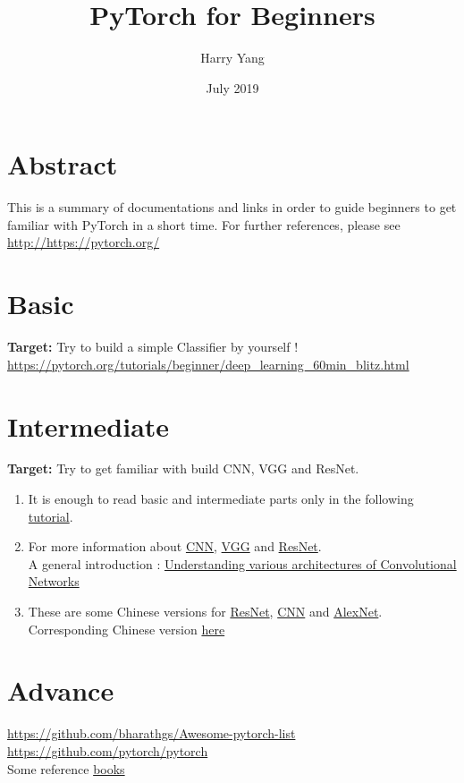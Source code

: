 \documentclass{article}
\title{PyTorch for Beginners}
\author{Harry Yang}
\date{July 2019}
\begin{document}
\maketitle

\section{Abstract}
This is a summary of documentations and links in order to guide beginners to get familiar with PyTorch in a short time. For further references, please see  \url{http://https://pytorch.org/} 
\section{Basic}
\textbf{Target: } Try to build a simple Classifier by yourself ! \\
\url{https://pytorch.org/tutorials/beginner/deep_learning_60min_blitz.html}
\section{Intermediate}
\textbf{Target: } Try to get familiar with build CNN, VGG and ResNet. \\
\begin{enumerate}
    \item It is enough to read basic and intermediate parts only in the following \href{https://github.com/yunjey/pytorch-tutorial/tree/master/tutorials}{tutorial}.
    \item For more information about \href{https://github.com/yunjey/pytorch-tutorial/tree/master/tutorials}{CNN}, \href{https://github.com/yunjey/pytorch-tutorial/tree/master/tutorials}{VGG} and \href{https://towardsdatascience.com/an-overview-of-resnet-and-its-variants-5281e2f56035}{ResNet}.\\
    A general introduction : \href{https://cv-tricks.com/cnn/understand-resnet-alexnet-vgg-inception/}{Understanding various architectures of Convolutional Networks}
    \item These are some Chinese versions for \href{https://zhuanlan.zhihu.com/p/31852747}{ResNet}, \href{https://blog.csdn.net/v_JULY_v/article/details/51812459}{CNN} and \href{https://blog.csdn.net/daydayup_668819/article/details/79744095}{AlexNet}.\\
    Corresponding Chinese version \href{https://zhuanlan.zhihu.com/p/32116277}{here}
\end{enumerate}

\section{Advance}
\url{https://github.com/bharathgs/Awesome-pytorch-list}\\
\url{https://github.com/pytorch/pytorch}\\
Some reference \href{https://srdas.github.io/DLBook/ConvNets.html}{books}
\end{document}
